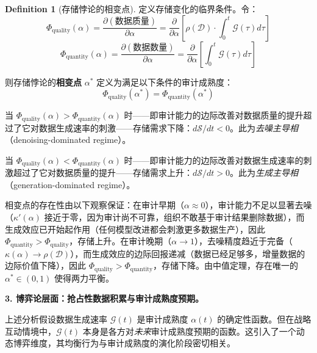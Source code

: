 \documentclass[12pt,a4paper]{ctexart}
\theoremstyle{definition}
\newtheorem{definition}{Definition}[section]
\theoremstyle{remark}
\begin{document}
\begin{definition}[存储悖论的相变点]
定义存储变化的临界条件。令：
\begin{equation}
\Phi_{\text{quality}}(\alpha) = \frac{\partial (\text{数据质量})}{\partial \alpha} = \frac{\partial}{\partial \alpha}\left[\rho(\mathcal{D}) \cdot \int_0^t \mathcal{G}(\tau) d\tau\right]
\end{equation}
\begin{equation}
\Phi_{\text{quantity}}(\alpha) = \frac{\partial (\text{数据数量})}{\partial \alpha} = \frac{\partial}{\partial \alpha}\left[\int_0^t \mathcal{G}(\tau) d\tau\right]
\end{equation}

则存储悖论的\textbf{相变点} $\alpha^*$ 定义为满足以下条件的审计成熟度：
\begin{equation}
\Phi_{\text{quality}}(\alpha^*) = \Phi_{\text{quantity}}(\alpha^*)
\end{equation}

当 $\Phi_{\text{quality}}(\alpha) > \Phi_{\text{quantity}}(\alpha)$ 时——即审计能力的边际改善对数据质量的提升超过了它对数据生成速率的刺激——存储需求下降：$d\mathcal{S}/dt < 0$。此为\textit{去噪主导相}（denoising-dominated regime）。

当 $\Phi_{\text{quality}}(\alpha) < \Phi_{\text{quantity}}(\alpha)$ 时——即审计能力的边际改善对数据生成速率的刺激超过了它对数据质量的提升——存储需求上升：$d\mathcal{S}/dt > 0$。此为\textit{生成主导相}（generation-dominated regime）。

相变点的存在性由以下观察保证：在审计早期（$\alpha \approx 0$），审计能力不足以显著去噪（$\kappa'(\alpha)$ 接近于零，因为审计尚不可靠，组织不敢基于审计结果删除数据），而生成效应已开始起作用（任何模型改进都会刺激更多数据生产），因此 $\Phi_{\text{quantity}} > \Phi_{\text{quality}}$，存储上升。在审计晚期（$\alpha \to 1$），去噪精度趋近于完备（$\kappa(\alpha) \to \rho(\mathcal{D})$），而生成效应的边际回报递减（数据已经足够多，增量数据的边际价值下降），因此 $\Phi_{\text{quality}} > \Phi_{\text{quantity}}$，存储下降。由中值定理，存在唯一的 $\alpha^* \in (0, 1)$ 使得两力平衡。
\end{definition}

\medskip
\noindent\textbf{3. 博弈论层面：抢占性数据积累与审计成熟度预期。}

上述分析假设数据生成速率 $\mathcal{G}(t)$ 是审计成熟度 $\alpha(t)$ 的确定性函数。但在战略互动情境中，$\mathcal{G}(t)$ 本身是各方对\textit{未来}审计成熟度预期的函数。这引入了一个动态博弈维度，其均衡行为与审计成熟度的演化阶段密切相关。
\end{document}
